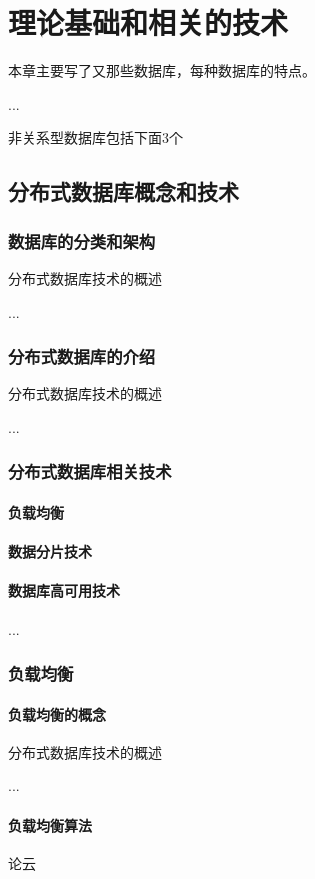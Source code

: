 
\chapter{理论基础和相关的技术}
本章主要写了又那些数据库，每种数据库的特点。

...


非关系型数据库包括下面3个
\section{分布式数据库概念和技术}
\subsection{数据库的分类和架构}
分布式数据库技术的概述

...
\subsection{分布式数据库的介绍}
分布式数据库技术的概述

...
\subsection{分布式数据库相关技术}

\subsubsection{负载均衡}
\subsubsection{数据分片技术}
\subsubsection{数据库高可用技术}
...
\subsection*{负载均衡}
\subsubsection*{负载均衡的概念}
分布式数据库技术的概述

...
\subsubsection*{负载均衡算法}
论云

